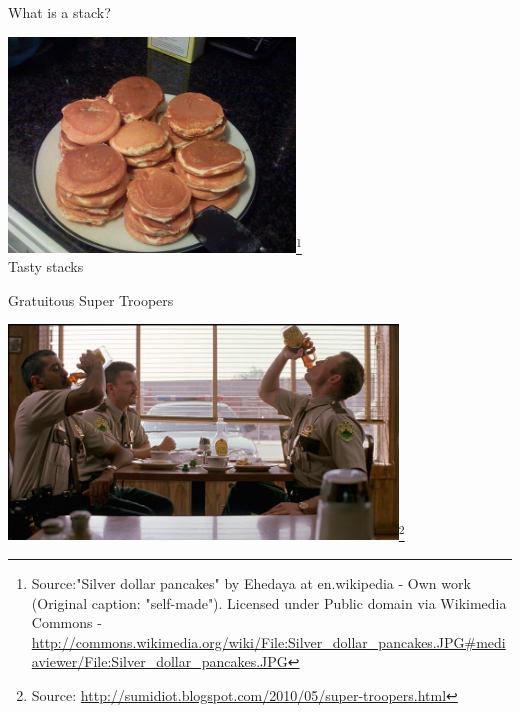 \documentclass{beamer}
\begin{document}
\begin{frame}[fragile]{What is a stack?}


\begin{center}
\includegraphics[height=2.25in]{640px-Silver_dollar_pancakes.jpeg}\footnote{Source:"Silver dollar pancakes" by Ehedaya at en.wikipedia - Own work (Original caption: "self-made"). Licensed under Public domain via Wikimedia Commons - \url{http://commons.wikimedia.org/wiki/File:Silver_dollar_pancakes.JPG\#mediaviewer/File:Silver_dollar_pancakes.JPG}}\\
Tasty stacks
\end{center}

\end{frame}

\begin{frame}[fragile]{Gratuitous Super Troopers}


\begin{center}
\includegraphics[height=2.25in]{syrup.png}\footnote{Source: \url{http://sumidiot.blogspot.com/2010/05/super-troopers.html}}
\end{center}

\end{frame}
\end{document}
